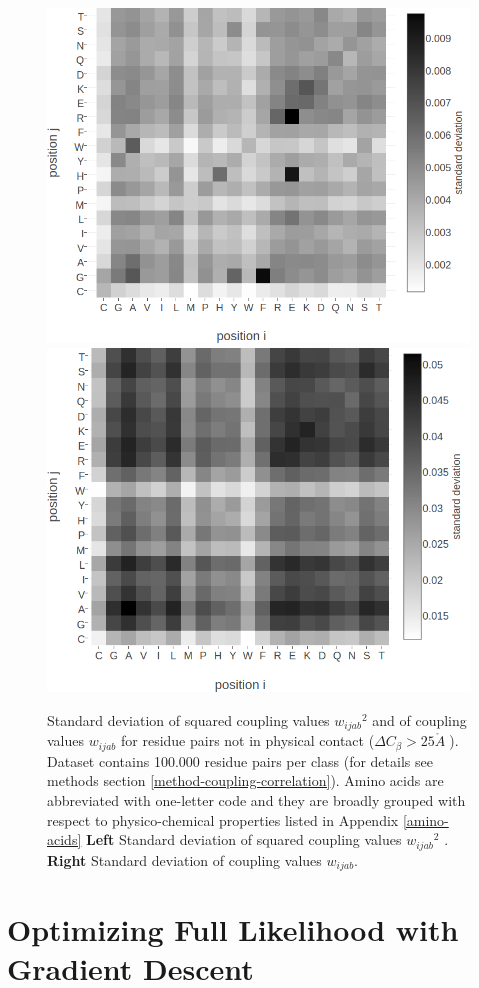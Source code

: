 \documentclass[11pt,a4paper,twoside]{book}
\newcommand{\Cb}{C_\beta}
\newcommand{\wijab}{w_{ijab}}
\newcommand{\angstrom}{\mathring{A} \;}
\theoremstyle{definition}
\theoremstyle{definition}
\theoremstyle{remark}
\begin{document}
\begin{figure}
\includegraphics[width=0.49\linewidth]{img/coupling_matrix_analysis/stdev_squared_couplings_noncontacts_heatmap_notitle} \includegraphics[width=0.49\linewidth]{img/coupling_matrix_analysis/stdev_couplings_noncontacts_heatmap_notitle} \caption{Standard deviation of squared
coupling values \({\wijab}^2\) and of coupling values \(\wijab\) for
residue pairs not in physical contact (\(\Delta \Cb > 25 \angstrom\)).
Dataset contains 100.000 residue pairs per class (for details see
methods section \ref{method-coupling-correlation}). Amino acids are
abbreviated with one-letter code and they are broadly grouped with
respect to physico-chemical properties listed in Appendix
\ref{amino-acids} \textbf{Left} Standard deviation of squared coupling
values \({\wijab}^2\) . \textbf{Right} Standard deviation of coupling
values \(\wijab\).}\label{fig:stdev-couplings-noncontacts}
\end{figure}

\chapter{Optimizing Full Likelihood with Gradient
Descent}\label{optimizing-full-likelihood-with-gradient-descent}
\end{document}

